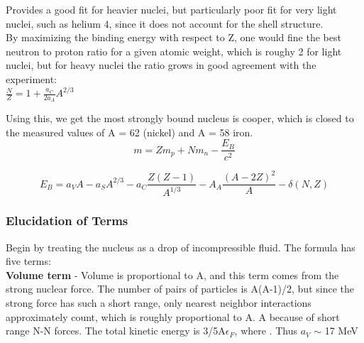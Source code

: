             Provides a good fit for heavier nuclei, but particularly poor fit for very light nuclei, such as helium 4, since it does not account for the shell structure.\\
            
            By maximizing the binding energy with respect to Z, one would fine the best neutron to proton ratio for a given atomic weight, which is roughy 2 for light nuclei, but for heavy nuclei the ratio grows in good agreement with the experiment:\\
            
            $\frac{N}{Z} = 1 + \frac{a_C}{2a_A}A^{2/3}$
            
            Using this, we get the most strongly bound nucleus is cooper, which is closed to the measured values of A = 62 (nickel) and A = 58 iron. \\
            
            \begin{equation}
                m = Zm_p +Nm_n -\frac{E_B}{c^2}
            \end{equation}

            \begin{equation}
                E_B = a_VA-a_SA^{2/3}-a_C\frac{Z(Z-1)}{A^{1/3}}-A_A\frac{(A-2Z)^2}{A}-\delta(N,Z)
            \end{equation}
 
            
            \subsubsection{Elucidation of Terms}
            
                \indent Begin by treating the nucleus as a drop of incompressible fluid. The formula has five terms:\\
                
                \indent \indent \textbf{Volume term} - Volume is proportional to A, and this term comes from the strong nuclear force. The number of pairs of particles is A(A-1)/2, but since the strong force has such a short range, only nearest neighbor interactions approximately count, which is roughly proportional to A. A because of short range N-N forces. The total kinetic energy is 3/5A$\epsilon_F$, where . Thus $a_V$ $\sim$ 17 MeV\\
                
